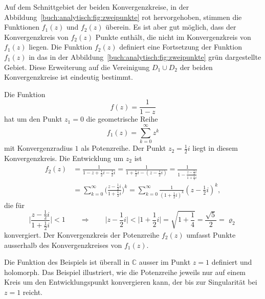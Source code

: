 Auf dem Schnittgebiet der beiden Konvergenzkreise, in der
Abbildung~\ref{buch:analytisch:fig:zweipunkte}
rot hervorgehoben, stimmen die Funktionen $f_1(z)$ und $f_2(z)$
überein.
Es ist aber gut möglich, dass der Konvergenzkreis von $f_2(z)$
Punkte enthält, die nicht im Konvergenzkreis von $f_1(z)$ liegen.
Die Funktion $f_2(z)$ definiert eine Fortsetzung der Funktion 
$f_1(z)$ in das in der 
Abbildung~\ref{buch:analytisch:fig:zweipunkte}
grün dargestellte Gebiet.
Diese Erweiterung auf die Vereinigung $D_1\cup D_2$ der beiden
Konvergenzkreise ist eindeutig bestimmt.

\begin{beispiel}
Die Funktion 
\[
f(z) = \frac{1}{1-z}
\]
hat um den Punkt $z_1=0$ die geometrische Reihe
\[
f_1(z)
=
\sum_{k=0}^\infty z^k
\]
mit Konvergenzradius $1$ als Potenzreihe.
Der Punkt $z_2=\frac12i$ liegt in diesem Konvergenzkreis.
Die Entwicklung um $z_2$ ist
\begin{align*}
f_2(z)
&=
\frac{1}{1-z+\frac12i-\frac12i}
=
\frac{1}{1+\frac12i-(z-\frac12i)}
=
\frac{1}{1-\frac{z-\frac12i}{1+\frac12i}}
\\
&=
\sum_{k=0}^\infty \biggl(\frac{z-\frac12i}{1+\frac12i}\biggr)^k
=
\sum_{k=0}^\infty \frac{1}{(1+\frac12i)^k}(z-{\textstyle\frac12}i)^k,
\end{align*}
die für 
\[
\biggl|\frac{z-\frac12i}{1+\frac12i}\biggr|<1
\qquad\Rightarrow\qquad
\bigl|z-{\textstyle\frac12}i\bigr|
<
\bigl|1+{\textstyle\frac12}i\bigr|
=
\!\sqrt{1+{\textstyle\frac14}}=\frac{\!\sqrt{5}}2 = \varrho_2
\]
konvergiert.
Der Konvergenzkreis der Potenzreihe $f_2(z)$ umfasst Punkte
ausserhalb des Konvergenzkreises von $f_1(z)$.
\end{beispiel}

Die Funktion des Beispiels ist überall in $\mathbb{C}$ ausser im Punkt
$z=1$ definiert und holomorph.
Das Beispiel illustriert, wie die Potenzreihe jeweils nur auf einem Kreis
um den Entwicklungspunkt konvergieren kann, der bis zur Singularität bei
$z=1$ reicht.

